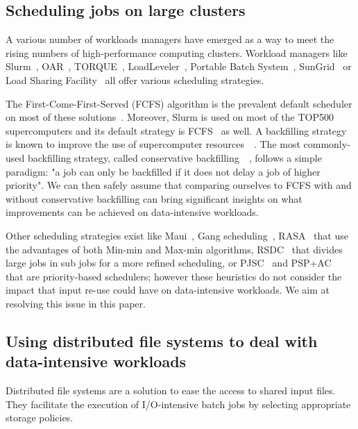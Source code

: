 \documentclass[sigconf,review,anonymous]{acmart}
\begin{document}
\subsection{Scheduling jobs on large clusters}

A various number of workloads managers have emerged 
as a way to meet the rising numbers of high-performance computing clusters.
Workload managers like Slurm~\cite{SLURM}, OAR~\cite{oar},
TORQUE~\cite{torque}, LoadLeveler~\cite{loadleveler},
Portable Batch System~\cite{pbs}, SunGrid~\cite{sungrid}
or Load Sharing Facility~\cite{lsf} all offer
various scheduling strategies.

The First-Come-First-Served (FCFS) algorithm is the prevalent default
scheduler on most of these solutions~\cite{survey_workload_manager_and_scheduler}.
Moreover, Slurm is used on most of the TOP500 supercomputers and its default strategy is FCFS~\cite{slurm_website_scheduling} as well.
A backfilling strategy is known to improve
the use of supercomputer resources~\cite{maui}~\cite{New_Backfill}. 
The most commonly-used backfilling strategy, called conservative 
backfilling~\cite{Characterization_of_Backfilling}~\cite{Introducing-New-Backfill-based}, follows
a simple paradigm: "a job can only be backfilled if it does not
delay a job of higher priority".
We can then safely assume that comparing ourselves to FCFS with and without conservative backfilling can 
bring significant insights on what improvements can be achieved on data-intensive workloads.

Other scheduling strategies exist like 
Maui~\cite{Maui_Scheduler}, Gang scheduling~\cite{gang_scheduling}, 
RASA~\cite{rasa} that use the advantages of both Min-min and Max-min algorithms,
RSDC~\cite{rsdc} that divides large jobs in sub jobs for a more refined scheduling,
or PJSC~\cite{pjsc} and PSP+AC~\cite{PSP_AC} that are priority-based schedulers; 
however these heuristics do not consider the impact that
input re-use could have on data-intensive workloads.
We aim at resolving this issue in this paper.

\subsection{Using distributed file systems to deal with data-intensive workloads}

Distributed file systems are a solution to ease the access to 
shared input files. They facilitate the execution of I/O-intensive batch
jobs by selecting appropriate storage policies.
\end{document}
